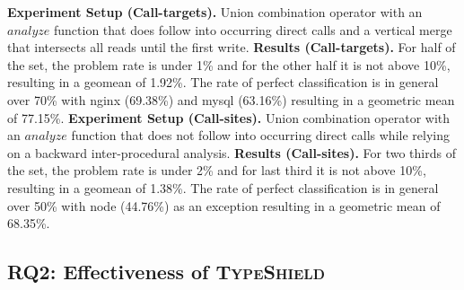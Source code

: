 \textbf{Experiment Setup (Call-targets).} Union combination operator with an $analyze$ function that does follow into occurring direct calls  and a vertical merge that intersects all reads until the first write.
\textbf{Results (Call-targets).} For half of the set, the problem rate is under 1\% and for the other half it is not above 10\%, resulting in a geomean of 1.92\%. The rate of perfect classification is in general over 70\% with nginx (69.38\%) and mysql (63.16\%)  resulting in a geometric mean of 77.15\%.
\textbf{Experiment Setup (Call-sites).} Union combination operator with an $analyze$ function that does not follow into occurring direct calls while relying on a backward inter-procedural analysis.
\textbf{Results (Call-sites).} For two thirds of the set, the problem rate is under 2\% and for last third it is not above 10\%, resulting in a geomean of 1.38\%.  The rate of perfect classification is in general over 50\% with node (44.76\%) as an exception resulting in a geometric mean of 68.35\%.


%
%
%
%
\subsection{RQ2: Effectiveness of \textsc{TypeShield}}
\label{section:typeshieldeffectiveness}

